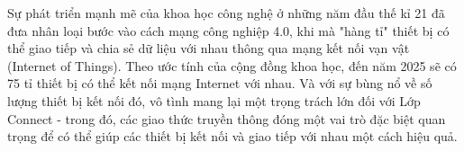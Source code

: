 Sự phát triển mạnh mẽ của khoa học công nghệ ở những năm đầu thế kỉ 21 đã đưa nhân loại bước vào cách mạng công nghiệp 4.0, khi mà "hàng tỉ" thiết bị có thể giao tiếp và chia sẻ dữ liệu với nhau thông qua mạng kết nối vạn vật (Internet of Things). Theo ước tính của cộng đồng khoa học, đến năm 2025 sẽ có 75 tỉ thiết bị có thể kết nối mạng Internet với nhau. Và với sự bùng nổ về số lượng thiết bị kết nối đó, vô tình mang lại một trọng trách lớn đối với Lớp Connect - trong đó, các giao thức truyền thông đóng một vai trò đặc biệt quan trọng để có thể giúp các thiết bị kết nối và giao tiếp với nhau một cách hiệu quả.




